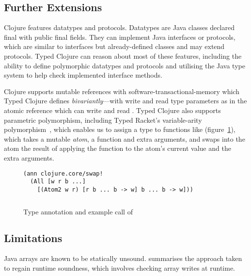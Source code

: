 \subsection{Further Extensions}

Clojure features datatypes and protocols. Datatypes are Java classes
declared final with public final fields. They can implement Java interfaces
or protocols, which are similar to interfaces but already-defined classes
and \nil{} may extend protocols.
%
Typed Clojure can reason about most of these features,
including the ability to define polymorphic datatypes and protocols and
utilising the Java type system to help check implemented interface methods.

%
%
Clojure supports mutable references with software-transactional-memory
which Typed Clojure defines \emph{bivariantly}---with write and read type parameters
as in the atomic reference  which can write and read .
Typed Clojure also supports parametric polymorphism, including
Typed Racket's variable-arity polymorphism~\cite{stf-esop}, 
which enables us to assign a type to functions like  (figure~\ref{main:fig:swap!}),
which takes a mutable \emph{atom},
a function and extra arguments, and swaps into the atom the result of
applying the function to the atom's current value and the extra arguments.

\begin{figure}
\begin{verbatim}
(ann clojure.core/swap! 
  (All [w r b ...] 
    [(Atom2 w r) [r b ... b -> w] b ... b -> w]))

\end{verbatim}
\inputminted[firstline=5,lastline=5]{clojure}{code/demo/src/demo/atom.clj}
\caption{Type annotation and example call of }
\label{main:fig:swap!}
\end{figure}

\subsection{Limitations}
Java arrays are known to be statically unsound.
\citet{Bra98} summarises the approach taken to regain runtime soundness, which involves
checking array writes at runtime.

